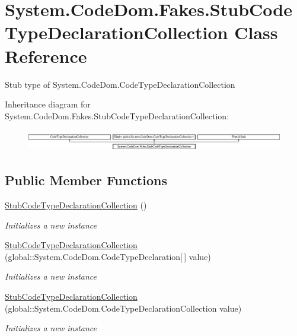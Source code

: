 \hypertarget{class_system_1_1_code_dom_1_1_fakes_1_1_stub_code_type_declaration_collection}{\section{System.\-Code\-Dom.\-Fakes.\-Stub\-Code\-Type\-Declaration\-Collection Class Reference}
\label{class_system_1_1_code_dom_1_1_fakes_1_1_stub_code_type_declaration_collection}
}


Stub type of System.\-Code\-Dom.\-Code\-Type\-Declaration\-Collection 


Inheritance diagram for System.\-Code\-Dom.\-Fakes.\-Stub\-Code\-Type\-Declaration\-Collection\-:\begin{figure}[H]
\begin{center}
\leavevmode
\includegraphics[height=0.952381cm]{class_system_1_1_code_dom_1_1_fakes_1_1_stub_code_type_declaration_collection}
\end{center}
\end{figure}
\subsection*{Public Member Functions}
\begin{DoxyCompactItemize}
\item 
\hyperlink{class_system_1_1_code_dom_1_1_fakes_1_1_stub_code_type_declaration_collection_af560fe489907cba0df9a492431574d8b}{Stub\-Code\-Type\-Declaration\-Collection} ()
\begin{DoxyCompactList}\small\item\em Initializes a new instance\end{DoxyCompactList}\item 
\hyperlink{class_system_1_1_code_dom_1_1_fakes_1_1_stub_code_type_declaration_collection_a2148a221c7a332981f97b3c15073ab06}{Stub\-Code\-Type\-Declaration\-Collection} (global\-::\-System.\-Code\-Dom.\-Code\-Type\-Declaration\mbox{[}$\,$\mbox{]} value)
\begin{DoxyCompactList}\small\item\em Initializes a new instance\end{DoxyCompactList}\item 
\hyperlink{class_system_1_1_code_dom_1_1_fakes_1_1_stub_code_type_declaration_collection_a9bdd49034d0ceef6aae5e6addd1ec285}{Stub\-Code\-Type\-Declaration\-Collection} (global\-::\-System.\-Code\-Dom.\-Code\-Type\-Declaration\-Collection value)
\begin{DoxyCompactList}\small\item\em Initializes a new instance\end{DoxyCompactList}\end{DoxyCompactItemize}

